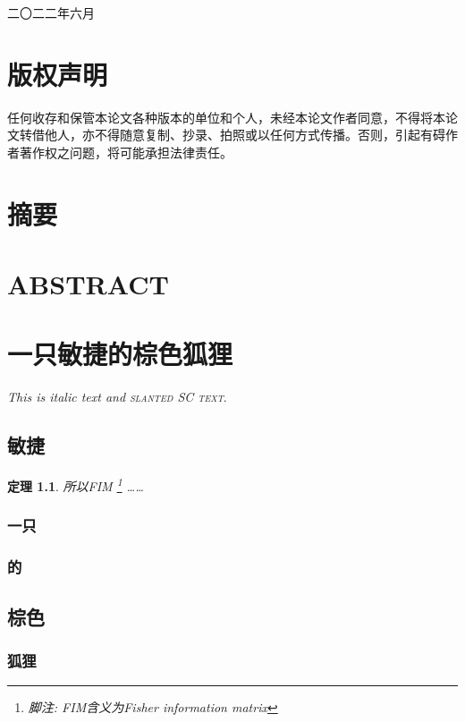 \documentclass[UTF8,openany,a4paper]{ctexbook}
\newtheorem{theorem}{定理}
\theoremstyle{definition}
\begin{document}
\begin{titlepage}
    \vspace{3cm}

    {\rmfamily{}二〇二二年六月}
\end{titlepage}

\doublespacing

\chapter*{版权声明}
任何收存和保管本论文各种版本的单位和个人，未经本论文作者同意，不得将本论文转借他人，亦不得随意复制、抄录、拍照或以任何方式传播。否则，引起有碍作者著作权之问题，将可能承担法律责任。

\chapter*{摘要}
\zhlipsum[5-10][name=zhufu]

\chapter*{ABSTRACT}
\lipsum[1-5][1-10]

\tableofcontents

\chapter{一只敏捷的棕色狐狸}
\setcounter{page}{1} %
\textit{This is italic text and \textsc{slanted SC text}}.
\section{敏捷}
\zhlipsum[1-2]
\begin{theorem}
    \zhlipsum[1][name=zhufu]
    所以FIM \footnote{脚注: FIM含义为Fisher information matrix} ……
\end{theorem}
\subsection{一只}
\zhlipsum[3]
\subsection{的}
\zhlipsum[4-5]
\section{棕色}
\zhlipsum[6]
\subsection{狐狸}
\zhlipsum[7]
\end{document}
